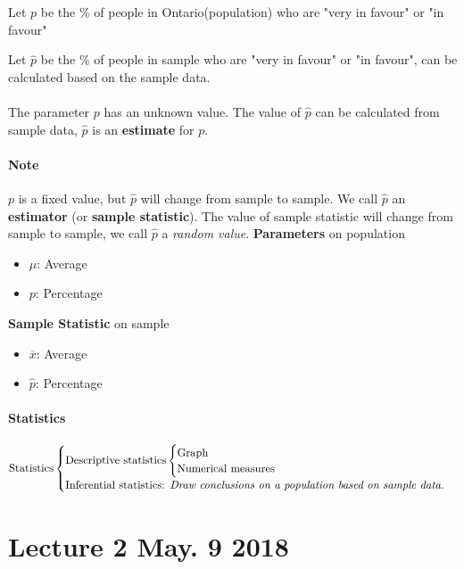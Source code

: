 \documentclass[11pt]{article}
\begin{document}
	Let $p$ be the \% of people in Ontario(population) who are "very in favour" or "in favour"
	
	Let $\hat{p}$ be the \% of people in sample who are "very in favour" or "in favour", can be calculated based on the sample data.
	
	\paragraph{}The parameter $p$ has an unknown value. The value of $\hat{p}$ can be calculated from sample data, $\hat{p}$ is an \textbf{estimate} for $p$.
	
	\paragraph{Note} $p$ is a fixed value, but $\hat{p}$ will change from sample to sample. We call $\hat{p}$ an \textbf{estimator} (or \textbf{sample statistic}). The value of sample statistic will change from sample to sample, we call $\hat{p}$ a \emph{random value}.
	\newline \quad
	\newline
	\textbf{Parameters} on population
	\begin{itemize}
		\item $\mu$: Average
		\item $p$: Percentage
	\end{itemize}
	\textbf{Sample Statistic} on sample
	\begin{itemize}
		\item $\overline{x}$: Average
		\item $\hat{p}$: Percentage
	\end{itemize}
	\paragraph{Statistics}
	\[
	\text{Statistics}
		\begin{cases}
			\text{Descriptive statistics}
				\begin{cases}
					\text{Graph} \\
					\text{Numerical measures} \\
				\end{cases}
			\\
			\text{Inferential statistics: \emph{Draw conclusions on a population based on sample data.}} \\
		\end{cases}
	\]
	
	\section{Lecture 2 May. 9 2018}
\end{document}
